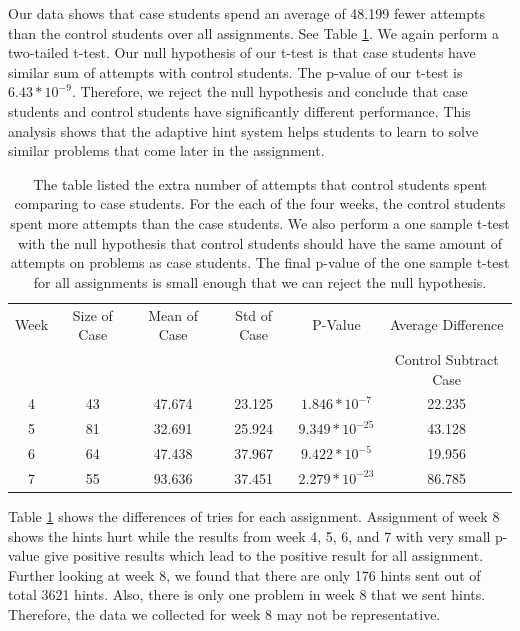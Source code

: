 \documentclass{llncs}
\begin{document}
Our data shows that case students spend an average of 48.199 fewer attempts than the control students over all assignments. See Table \ref{tab:no_hint}. We again perform a two-tailed t-test. Our null hypothesis of our t-test is that case students have similar sum of attempts with control students. The p-value of our t-test is $6.43 * 10^{-9}$. Therefore, we reject the null hypothesis and conclude that case students and control students have significantly different performance. This analysis shows that the adaptive hint system helps students to learn to solve similar problems that come later in the assignment. 

\begin{table}[th]
\caption{The table listed the extra number of attempts that control students spent comparing to case students. For the each of the four weeks, the control students spent more attempts than the case students. We also perform a one sample t-test with the null hypothesis that control students should have the same amount of attempts on problems as case students. The final p-value of the one sample t-test for all assignments is small enough that we can reject the null hypothesis.}
\begin{center}
  \begin{tabular}{| c | c | c | c | c | c |}
  \hline
   Week & Size of Case & Mean of Case & Std of Case &  P-Value & Average Difference\\
      & & & & & Control Subtract Case  \\ \hline
	4 & 43 & 47.674 & 23.125 & $1.846 * 10^{-7}$ & 22.235\\
	5 & 81 & 32.691 & 25.924 & $9.349 * 10 ^{-25}$ & 43.128\\
	6 & 64 & 47.438 & 37.967 & $9.422 * 10^{-5}$ & 19.956 \\
	7 & 55 & 93.636 & 37.451 & $2.279 * 10^{-23}$ & 86.785\\
	\hline
  \end{tabular}
  \label{tab:no_hint}
  \end{center}
\end{table}

Table \ref{tab:no_hint} shows the differences of tries for each assignment. Assignment of week 8 shows the hints hurt while the results from week 4, 5, 6, and 7 with very small p-value give positive results which lead to the positive result for all assignment. Further looking at week 8, we found that there are only 176 hints sent out of total 3621 hints. Also, there is only one problem in week 8 that we sent hints. Therefore, the data we collected for week 8 may not be representative.
\end{document}
